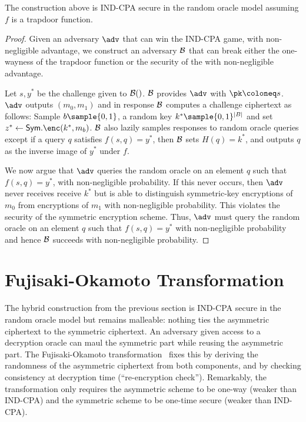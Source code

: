 \begin{theorem}
    The construction above is IND-CPA secure in the random oracle model assuming $f$ is a trapdoor function.
\end{theorem}
\begin{proof}
    Given an adversary $\adv$ that can win the IND-CPA game, with non-negligible advantage, we construct an adversary $\mathcal{B}$ that can break either the one-wayness of the trapdoor function or the security of the with non-negligible advantage.

    Let $s, y^*$ be the challenge given to $\mathcal{B}()$. $\mathcal{B}$ provides $\adv$ with $\pk \coloneq s$. $\adv$ outputs $(m_0, m_1)$ and in response $\mathcal{B}$ computes a challenge ciphertext as follows: Sample $b \sample \{0,1\}$, a random key $k^* \sample \{0,1\}^{|B|}$ and set $z^* \gets \mathsf{Sym}.\enc(k^*, m_b)$. $\mathcal{B}$ also lazily samples responses to random oracle queries except if a query $q$ satisfies $f(s, q) = y^*$, then $\mathcal{B}$ sets $H(q) = k^*$, and outputs $q$ as the inverse image of $y^*$ under $f$.

    We now argue that $\adv$ queries the random oracle on an element $q$ such that $f(s, q) = y^*$, with non-negligible probability. If this never occurs, then $\adv$ never receives receive $k^*$ but is able to distinguish symmetric-key encryptions of $m_0$ from encryptions of $m_1$ with non-negligible probability. This violates the security of the symmetric encryption scheme. Thus, $\adv$ must query the random oracle on an element $q$ such that $f(s, q) = y^*$ with non-negligible probability and hence $\mathcal{B}$ succeeds with non-negligible probability.
\end{proof}

\section{Fujisaki-Okamoto Transformation}

The hybrid construction from the previous section is IND-CPA secure in the random oracle model but remains malleable: nothing ties the asymmetric ciphertext to the symmetric ciphertext. An adversary given access to a decryption oracle can maul the symmetric part while reusing the asymmetric part. The Fujisaki-Okamoto transformation~\cite{C:FujOka99} fixes this by deriving the randomness of the asymmetric ciphertext from both components, and by checking consistency at decryption time (``re-encryption check''). Remarkably, the transformation only requires the asymmetric scheme to be one-way (weaker than IND-CPA) and the symmetric scheme to be one-time secure (weaker than IND-CPA).

